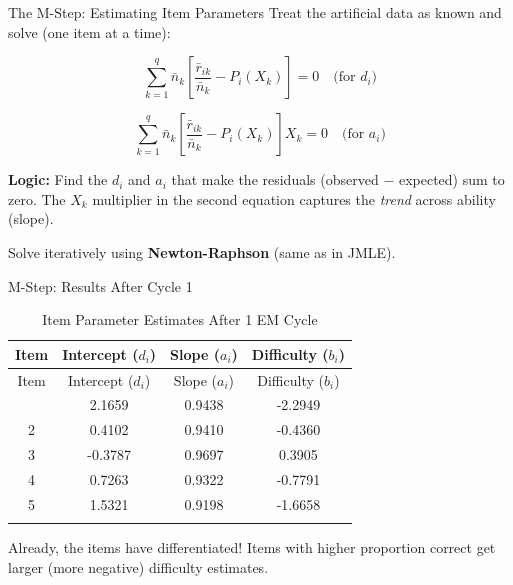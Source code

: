 \documentclass[
  ignorenonframetext,
]{beamer}
\begin{document}
\begin{frame}{The M-Step: Estimating Item Parameters}
\label{the-m-step-estimating-item-parameters}
Treat the artificial data as known and solve (one item at a time):

\[\sum_{k=1}^{q} \bar{n}_k \left[\frac{\bar{r}_{ik}}{\bar{n}_k} - P_i(X_k)\right] = 0 \quad \text{(for } d_i\text{)}\]

\[\sum_{k=1}^{q} \bar{n}_k \left[\frac{\bar{r}_{ik}}{\bar{n}_k} - P_i(X_k)\right] X_k = 0 \quad \text{(for } a_i\text{)}\]

\textbf{Logic:} Find the \(d_i\) and \(a_i\) that make the residuals
(observed \(-\) expected) sum to zero. The \(X_k\) multiplier in the
second equation captures the \emph{trend} across ability (slope).

Solve iteratively using \textbf{Newton-Raphson} (same as in JMLE).
\end{frame}

\begin{frame}{M-Step: Results After Cycle 1}
\label{m-step-results-after-cycle-1}
\begin{longtable}[]{@{}cccc@{}}
\caption{Item Parameter Estimates After 1 EM Cycle}\tabularnewline
\toprule\noalign{}
Item & Intercept (\(d_i\)) & Slope (\(a_i\)) & Difficulty (\(b_i\)) \\
\midrule\noalign{}
\endfirsthead
\toprule\noalign{}
Item & Intercept (\(d_i\)) & Slope (\(a_i\)) & Difficulty (\(b_i\)) \\
\midrule\noalign{}
\endhead
1 & 2.1659 & 0.9438 & -2.2949 \\
2 & 0.4102 & 0.9410 & -0.4360 \\
3 & -0.3787 & 0.9697 & 0.3905 \\
4 & 0.7263 & 0.9322 & -0.7791 \\
5 & 1.5321 & 0.9198 & -1.6658 \\
\bottomrule\noalign{}
\end{longtable}

Already, the items have differentiated! Items with higher proportion
correct get larger (more negative) difficulty estimates.
\end{frame}
\end{document}
